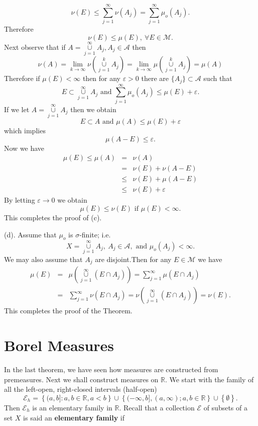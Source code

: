\documentclass[12pt]{report}
\begin{document}
\[
\nu(E) \le \sum^\infty_{j=1}\nu(A_j) = \sum^\infty_{j=1} \mu_o (A_j).
\] Therefore
\begin{equation*}
\nu (E) \le \mu(E), \ \forall E \in \mathcal{M}.
\end{equation*} Next observe that if $A =
\overset{\infty}{\underset{j=1}{\cup}} A_j, A_j \in
\mathcal{A}$ then
\[\nu(A) = \lim_{k \to \infty} \nu \left ( \overset{k}{\underset{j=1}{\cup}} 
A_j
\right ) =
\lim_{k \to
\infty} \mu \left ( \overset{k}{\underset{j=1}{\cup}}  A_j \right ) =
\mu(A)
\] Therefore if $\mu (E) < \infty$ then for any $\varepsilon > 0 $ there
are
$\{A_j\}
\subset \mathcal{A}$ such that
\[ E \subset \overset{\infty}{\underset{j=1}{\cup}}  A_j \mbox{ and }
\sum^\infty_{j=1} \mu_o(A_j) \le
\mu(E) + \varepsilon.
\] If we let $A = \overset{\infty}{\underset{j=1}{\cup}}A_j$ then we
obtain
\[ E \subset A \mbox{ and } \mu(A) \le  \mu(E) + \varepsilon
\] which implies
\[
\mu(A - E) \le \varepsilon.
\] Now we have
\begin{eqnarray*}
\mu(E) \le  \mu(A) &=& \nu(A)\\ &=& \nu(E) + \nu(A - E)\\ &\le&
\nu(E) + \mu(A - E)\\ &\le& \nu (E) + \varepsilon
\end{eqnarray*} By letting $\varepsilon \longrightarrow 0$ we obtain
\[
\mu (E) \le \nu(E) \mbox{ if } \mu(E) < \infty.
\] This completes the proof of (c).

\medskip
\noindent (d).  Assume that $\mu_o$ is $\sigma$-finite; i.e.
\[ X = \overset{\infty}{\underset{j=1}{\cup}} A_j, \ A_j \in \mathcal{A},
\mbox{ and }
\mu_o(A_j) < \infty.
\] We may also assume that $A_j$ are disjoint.Then for any $E \in
\mathcal{M}$ we have
\begin{eqnarray*}
 \mu(E) &=& \mu \left ( \overset{\infty}{\underset{j=1}{\cup}}  (E
\cap A_j) \right ) =
\sum^\infty_{j=1} \mu(E \cap A_j)\\ &=& \sum^\infty_{j=1} \nu(E
\cap A_j) = \nu \left (
\overset{\infty}{\underset{j=1}{\cup}}  (E
\cap A_j)
\right ) = \nu(E).
\end{eqnarray*} This completes the proof of the Theorem.

\section{Borel Measures}
 In the last theorem, we have seen how measures are
constructed from premeasures.  Next we shall construct measures on
$\mathbb{R}$.  We start with the family of all the left-open, right-closed
intervals (half-open)
\[
\mathcal{E}_h = \left \{ (a, b]: a, b \in \mathbb{R}, a < b \right \} \cup
\left \{ (-\infty, b], (a, \infty); a, b \in \mathbb{R} \right \} \cup \left \{
\emptyset\right \}.
\] Then $\mathcal{E}_h$ is an elementary family in $\mathbb{R}$.  Recall
that a collection
$\mathcal{E}$ of subsets of a set $X$ is said an
{\bf  elementary family} if
\end{document}
